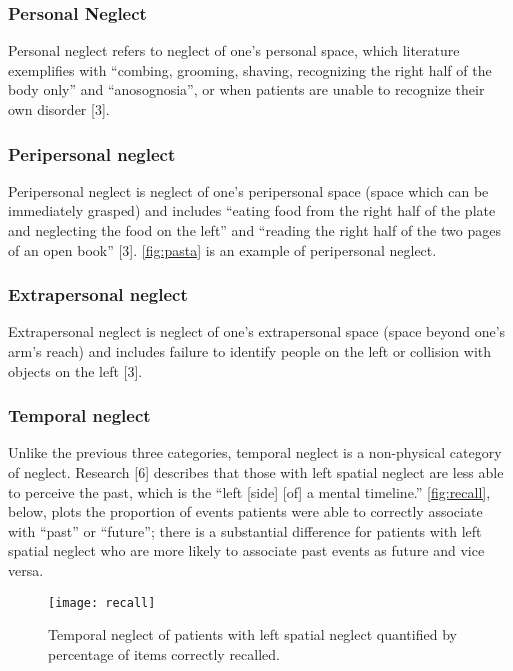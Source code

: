 \subsubsection{Personal Neglect}

Personal neglect refers to neglect of one’s personal space, which literature
exemplifies with ``combing, grooming, shaving, recognizing the right half of the
body only'' and ``anosognosia'', or when patients are unable to recognize their
own disorder [3].

\subsubsection{Peripersonal neglect}

Peripersonal neglect is neglect of one’s peripersonal space (space which can be
immediately grasped) and includes ``eating food from the right half of the plate
and neglecting the food on the left'' and ``reading the right half of the two
pages of an open book'' [3]. \autoref{fig:pasta} is an example of peripersonal
neglect.

\subsubsection{Extrapersonal neglect}

Extrapersonal neglect is neglect of one’s extrapersonal space (space beyond
one’s arm’s reach) and includes failure to identify people on the left or
collision with objects on the left [3].

\subsubsection{Temporal neglect}

Unlike the previous three categories, temporal neglect is a non-physical
category of neglect. Research [6] describes that those with left spatial
neglect are less able to perceive the past, which is the ``left [side] [of] a
mental timeline.'' \autoref{fig:recall}, below, plots the proportion of events patients were
able to correctly associate with ``past'' or ``future''; there is a substantial
difference for patients with left spatial neglect who are more likely to
associate past events as future and vice versa.

\begin{figure}[h]
  \centering
  \texttt{[image: recall]}
  \caption{Temporal neglect of patients with left spatial neglect quantified by
    percentage of items correctly recalled.}
  \label{fig:recall}
\end{figure}

